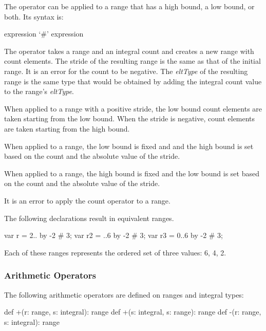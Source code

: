 The \chpl{#} operator can be applied to a range that has a high bound,
a low bound, or both.  Its syntax is:
\begin{syntax}
expression `#' expression
\end{syntax}

The \chpl{#} operator takes a range and an integral count and creates
a new range with count elements. The stride of the resulting range is
the same as that of the initial range. It is an error for the count to
be negative.  The \emph{eltType} of the resulting range is the same
type that would be obtained by adding the integral count value to the
range's \emph{eltType}.

When applied to a  range with a positive
stride, the low bound count elements are taken starting from the low
bound. When the stride is negative, count elements are taken starting
from the high bound.

When applied to a  range, the low bound
is fixed and and the high bound is set based on the count and the
absolute value of the stride.

When applied to a  range, the high
bound is fixed and the low bound is set based on the count and the
absolute value of the stride.

It is an error to apply the count operator to a
 range.

\begin{example}
The following declarations result in equivalent ranges.
\begin{chapel}
var r = 2.. by -2 # 3;
var r2 = ..6 by -2 # 3;
var r3 = 0..6 by -2 # 3;
\end{chapel}
Each of these ranges represents the ordered set of three values: 6, 4, 2.
\end{example}

\subsubsection{Arithmetic Operators}
\label{Range_Arithmetic}

The following arithmetic operators are defined on ranges and integral
types:

\begin{chapel}
def +(r: range, s: integral): range
def +(s: integral, s: range): range
def -(r: range, s: integral): range
\end{chapel}

